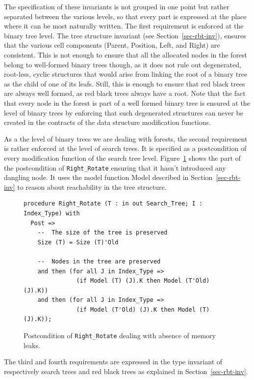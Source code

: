 \documentclass[11pt,a4paper]{article}
\begin{document}
The specification of these invariants is not grouped in one point but rather separated between the various levels,
so that every part is expressed at the place where it can be most naturally written. The first requirement is
enforced at the binary tree level. The tree structure invariant (see Section~\ref{sec-rbt-inv}),
ensures that the various cell components (Parent, Position, Left, and Right) are consistent. This is not enough
to ensure that all the allocated nodes in the forest belong to well-formed binary trees though, as it does
not rule out degenerated, root-less, cyclic structures that would arise from linking the root of a binary tree as the
child of one of its leafs. Still, this is enough to ensure that red black trees are always well formed, as red black
trees always have a root. Note that the fact that every node in the forest is part of
a well formed binary tree is ensured at the level of binary trees by enforcing that such degenerated structures can
never be created in the contracts of the data structure modification functions.

As a the level of binary trees we are dealing with forests, the second requirement is rather enforced at the level of
search trees. It is specified as a postcondition of every modification function of the search tree level.
Figure~\ref{fig-spec-no-leak} shows the part of the postcondition of \texttt{Right\_Rotate} ensuring that it hasn't introduced
any dangling node. It uses the model function Model described in Section~\ref{sec-rbt-inv} to reason about reachability
in the tree structure.

\begin{figure}[ht]
\begin{small}
\begin{lstlisting}
procedure Right_Rotate (T : in out Search_Tree; I : Index_Type) with
  Post =>
    --  The size of the tree is preserved
    Size (T) = Size (T)'Old

    --  Nodes in the tree are preserved
    and then (for all J in Index_Type =>
               (if Model (T) (J).K then Model (T'Old) (J).K))
    and then (for all J in Index_Type =>
               (if Model (T'Old) (J).K then Model (T) (J).K));
\end{lstlisting}
\end{small}
\caption{\label{fig-spec-no-leak} Postcondition of \texttt{Right\_Rotate} dealing with absence of memory leaks.}
\end{figure}

The third and fourth requirements are expressed in the type invariant of respectively search trees and red black trees
as explained in Section~\ref{sec-rbt-inv}.
\end{document}
